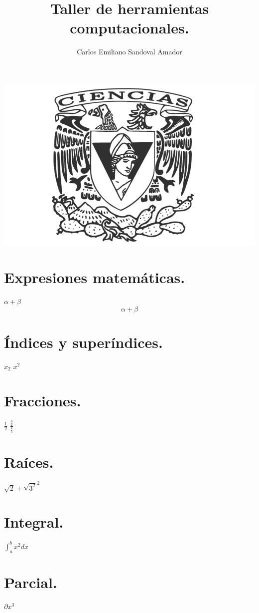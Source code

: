 \documentclass{article}
\title{\Huge Taller de herramientas computacionales.}
\author{Carlos Emiliano Sandoval Amador}
\begin{document}
	\maketitle
	\begin{center}
		\includegraphics[scale=0.40]{ciencias.png}
	\end{center}
	\section*{Expresiones matemáticas.}
	$\alpha + \beta$ \\
	\[\alpha + \beta\]
	\section*{Índices y superíndices.}
	$x_{2}$ $x^{2}$
	\section*{Fracciones.}
	$\frac{1}{2}$
	$\frac{\frac{3}{2}}{\frac{4}{5}}$
	\section*{Raíces.}
	$\sqrt{2} + \sqrt{3^2}^2$
	\section*{Integral.}
	$\int_{a}^{b}x^2dx$
	\section*{Parcial.}
	$\partial x^3$
	
\end{document}
